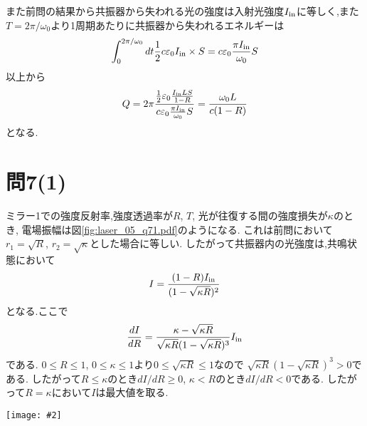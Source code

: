 \documentclass[uplatex,a4j,11pt,dvipdfmx]{jsarticle}
\makeatletter
\def\fgcaption{\def\@captype{figure}\caption}
\newcommand{\mfig}[3][width=15cm]{
\begin{center}
\texttt{[image: \#2]}
\fgcaption{#3 \label{fig:#2}}
\end{center}
}
\makeatother
\begin{document}
また前問の結果から共振器から失われる光の強度は入射光強度$I_{\rm in}$に等しく,また$T=2\pi/\omega_0$より1周期あたりに共振器から失われるエネルギーは
\begin{align}
  \int^{2\pi/\omega_0}_0dt\frac{1}{2}c\varepsilon_0I_{\rm in}\times S=c\varepsilon_0\frac{\pi I_{\rm in}}{\omega_0}S
\end{align}
以上から
\begin{align}
  Q=2\pi\frac{\frac{1}{2}\varepsilon_0\frac{I_{\rm in}LS}{1-R}}{c\varepsilon_0\frac{\pi I_{\rm in}}{\omega_0}S}=\frac{\omega_0 L}{c(1-R)}
\end{align}
となる.
\section*{問7(1)}
ミラー1での強度反射率,強度透過率が$R$, $T$, 光が往復する間の強度損失が$\kappa$のとき,
電場振幅は図\ref{fig:laser_05_q71.pdf}のようになる.
これは前問において$r_1=\sqrt{R}$, $r_2=\sqrt{\kappa}$とした場合に等しい.
したがって共振器内の光強度は,共鳴状態において
\begin{align}
  I=\frac{(1-R)I_{\rm in}}{(1-\sqrt{\kappa R})^2}
\end{align}
となる.ここで
\begin{align}
  \frac{dI}{dR}=\frac{\kappa-\sqrt{\kappa R}}{\sqrt{\kappa R}(1-\sqrt{\kappa R})^3}I_{\rm in}
\end{align}
である. $0\leq R\leq 1$, $0\leq \kappa\leq 1$より$0\leq\sqrt{\kappa R}\leq 1$なので
$\sqrt{\kappa R}(1-\sqrt{\kappa R})^3>0$である.
したがって$R\leq\kappa$のとき$dI/dR\geq0$, $\kappa<R$のとき$dI/dR<0$である.
したがって$R=\kappa$において$I$は最大値を取る.
\mfig[width=8cm]{laser_05_q71.pdf}{損失$\kappa$のときの電場}
\end{document}
